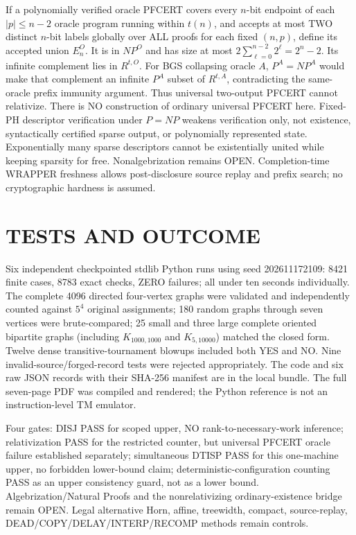\documentclass[11pt]{article}
\begin{document}
If a polynomially verified oracle PFCERT covers every $n$-bit endpoint of each $|p|\le n-2$ oracle program running within $t(n)$, and accepts at most TWO distinct $n$-bit labels globally over ALL proofs for each fixed $(n,p)$, define its accepted union $E_n^O$. It is in $NP^O$ and has size at most $2\sum_{\ell=0}^{n-2}2^\ell=2^n-2$. Its infinite complement lies in $R^{t,O}$. For BGS collapsing oracle $A$, $P^A=NP^A$ would make that complement an infinite $P^A$ subset of $R^{t,A}$, contradicting the same-oracle prefix immunity argument. Thus universal two-output PFCERT cannot relativize. There is NO construction of ordinary universal PFCERT here. Fixed-PH descriptor verification under $P=NP$ weakens verification only, not existence, syntactically certified sparse output, or polynomially represented state. Exponentially many sparse descriptors cannot be existentially united while keeping sparsity for free. Nonalgebrization remains OPEN. Completion-time WRAPPER freshness allows post-disclosure source replay and prefix search; no cryptographic hardness is assumed.

\section{TESTS AND OUTCOME}
Six independent checkpointed stdlib Python runs using seed 202611172109: 8421 finite cases, 8783 exact checks, ZERO failures; all under ten seconds individually. The complete 4096 directed four-vertex graphs were validated and independently counted against $5^4$ original assignments; 180 random graphs through seven vertices were brute-compared; 25 small and three large complete oriented bipartite graphs (including $K_{1000,1000}$ and $K_{5,10000}$) matched the closed form. Twelve dense transitive-tournament blowups included both YES and NO. Nine invalid-source/forged-record tests were rejected appropriately. The code and six raw JSON records with their SHA-256 manifest are in the local bundle. The full seven-page PDF was compiled and rendered; the Python reference is not an instruction-level TM emulator.

Four gates: DISJ PASS for scoped upper, NO rank-to-necessary-work inference; relativization PASS for the restricted counter, but universal PFCERT oracle failure established separately; simultaneous DTISP PASS for this one-machine upper, no forbidden lower-bound claim; deterministic-configuration counting PASS as an upper consistency guard, not as a lower bound. Algebrization/Natural Proofs and the nonrelativizing ordinary-existence bridge remain OPEN. Legal alternative Horn, affine, treewidth, compact, source-replay, DEAD/COPY/DELAY/INTERP/RECOMP methods remain controls.
\end{document}
